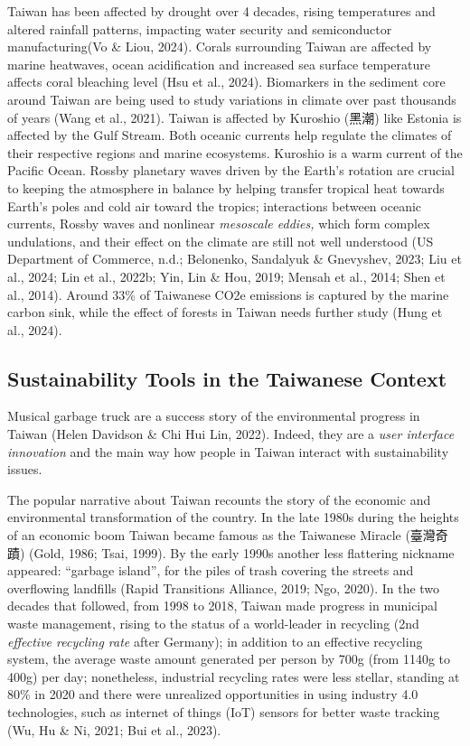 \documentclass[
  letterpaper,
  DIV=11,
  numbers=noendperiod]{scrartcl}
\begin{document}
Taiwan has been affected by drought over 4 decades, rising temperatures
and altered rainfall patterns, impacting water security and
semiconductor manufacturing\hspace{0pt}(Vo \& Liou, 2024). Corals
surrounding Taiwan are affected by marine heatwaves, ocean acidification
and increased sea surface temperature affects coral bleaching level (Hsu
et al., 2024). Biomarkers in the sediment core around Taiwan are being
used to study variations in climate over past thousands of years (Wang
et al., 2021). Taiwan is affected by Kuroshio (黑潮) like Estonia is
affected by the Gulf Stream. Both oceanic currents help regulate the
climates of their respective regions and marine ecosystems. Kuroshio is
a warm current of the Pacific Ocean. Rossby planetary waves driven by
the Earth's rotation are crucial to keeping the atmosphere in balance by
helping transfer tropical heat towards Earth's poles and cold air toward
the tropics; interactions between oceanic currents, Rossby waves and
nonlinear \emph{mesoscale eddies,} which form complex undulations, and
their effect on the climate are still not well understood (US Department
of Commerce, n.d.; Belonenko, Sandalyuk \& Gnevyshev, 2023; Liu et al.,
2024; Lin et al., 2022b; Yin, Lin \& Hou, 2019; Mensah et al., 2014;
Shen et al., 2014). Around 33\% of Taiwanese CO2e emissions is captured
by the marine carbon sink, while the effect of forests in Taiwan needs
further study (Hung et al., 2024).

\subsection{Sustainability Tools in the Taiwanese
Context}\label{sustainability-tools-in-the-taiwanese-context}

Musical garbage truck are a success story of the environmental progress
in Taiwan (Helen Davidson \& Chi Hui Lin, 2022). Indeed, they are a
\emph{user interface innovation} and the main way how people in Taiwan
interact with sustainability issues.

The popular narrative about Taiwan recounts the story of the economic
and environmental transformation of the country. In the late 1980s
during the heights of an economic boom Taiwan became famous as the
Taiwanese Miracle (臺灣奇蹟) (Gold, 1986; Tsai, 1999). By the early
1990s another less flattering nickname appeared: ``garbage island'', for
the piles of trash covering the streets and overflowing landfills (Rapid
Transitions Alliance, 2019; Ngo, 2020). In the two decades that
followed, from 1998 to 2018, Taiwan made progress in municipal waste
management, rising to the status of a world-leader in recycling (2nd
\emph{effective recycling rate} after Germany); in addition to an
effective recycling system, the average waste amount generated per
person by 700g (from 1140g to 400g) per day; nonetheless, industrial
recycling rates were less stellar, standing at 80\% in 2020 and there
were unrealized opportunities in using industry 4.0 technologies, such
as internet of things (IoT) sensors for better waste tracking (Wu, Hu \&
Ni, 2021; Bui et al., 2023).
\end{document}
